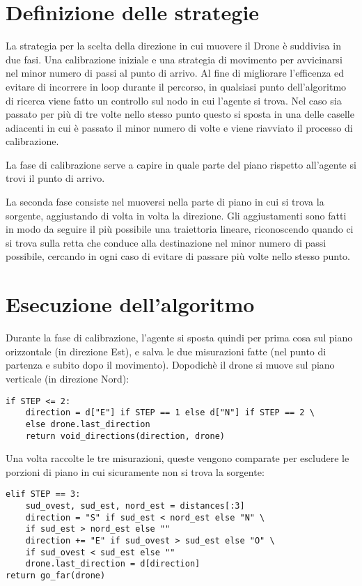 \section{Definizione delle strategie}
La strategia per la scelta della direzione in cui muovere il Drone è suddivisa in due fasi. Una calibrazione iniziale e una strategia di movimento per avvicinarsi nel minor numero di passi al punto di arrivo. Al fine di migliorare l'efficenza ed evitare di incorrere in loop durante il percorso, in qualsiasi punto dell'algoritmo di ricerca viene fatto un controllo sul nodo in cui l'agente si trova. Nel caso sia passato per più di tre volte nello stesso punto questo si sposta in una delle caselle adiacenti in cui è passato il minor numero di volte e viene riavviato il processo di calibrazione.

La fase di calibrazione serve a capire in quale parte del piano rispetto all'agente si trovi il punto di arrivo. 

La seconda fase consiste nel muoversi nella parte di piano in cui si trova la sorgente, aggiustando di volta in volta la direzione. Gli aggiustamenti sono fatti in modo da seguire il più possibile una traiettoria lineare, riconoscendo quando ci si trova sulla retta che conduce alla destinazione nel minor numero di passi possibile, cercando in ogni caso di evitare di passare più volte nello stesso punto.
	
\section{Esecuzione dell'algoritmo}
Durante la fase di calibrazione, l'agente si sposta quindi per prima cosa sul piano orizzontale (in direzione Est), e salva le due misurazioni fatte (nel punto di partenza e subito dopo il movimento). Dopodichè il drone si muove sul piano verticale (in direzione Nord): 
\begin{verbatim}
if STEP <= 2:
    direction = d["E"] if STEP == 1 else d["N"] if STEP == 2 \
    else drone.last_direction
    return void_directions(direction, drone)
\end{verbatim}
Una volta raccolte le tre misurazioni, queste vengono comparate per escludere le porzioni di piano in cui sicuramente non si trova la sorgente:
\begin{verbatim}
elif STEP == 3:
    sud_ovest, sud_est, nord_est = distances[:3]
    direction = "S" if sud_est < nord_est else "N" \
    if sud_est > nord_est else ""
    direction += "E" if sud_ovest > sud_est else "O" \
    if sud_ovest < sud_est else ""
    drone.last_direction = d[direction]
return go_far(drone)
\end{verbatim}


